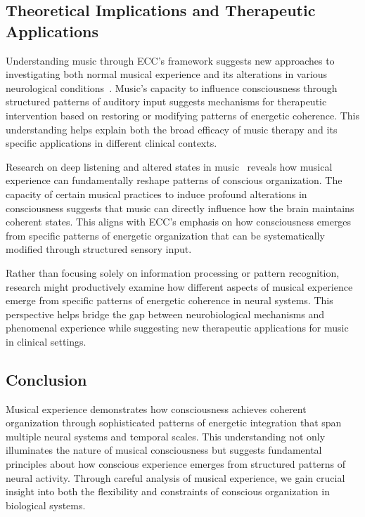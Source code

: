 \subsection*{Theoretical Implications and Therapeutic Applications}
Understanding music through ECC's framework suggests new approaches to investigating both normal musical experience and its alterations in various neurological conditions~\cite{Schaefer2014, da2024mathematical, amil2024theta}. Music's capacity to influence consciousness through structured patterns of auditory input suggests mechanisms for therapeutic intervention based on restoring or modifying patterns of energetic coherence. This understanding helps explain both the broad efficacy of music therapy and its specific applications in different clinical contexts.

Research on deep listening and altered states in music~\cite{Becker2004, zheng2025unbearable} reveals how musical experience can fundamentally reshape patterns of conscious organization. The capacity of certain musical practices to induce profound alterations in consciousness suggests that music can directly influence how the brain maintains coherent states. This aligns with ECC's emphasis on how consciousness emerges from specific patterns of energetic organization that can be systematically modified through structured sensory input.

Rather than focusing solely on information processing or pattern recognition, research might productively examine how different aspects of musical experience emerge from specific patterns of energetic coherence in neural systems. This perspective helps bridge the gap between neurobiological mechanisms and phenomenal experience while suggesting new therapeutic applications for music in clinical settings.

\subsection*{Conclusion}
Musical experience demonstrates how consciousness achieves coherent organization through sophisticated patterns of energetic integration that span multiple neural systems and temporal scales. This understanding not only illuminates the nature of musical consciousness but suggests fundamental principles about how conscious experience emerges from structured patterns of neural activity. Through careful analysis of musical experience, we gain crucial insight into both the flexibility and constraints of conscious organization in biological systems.


